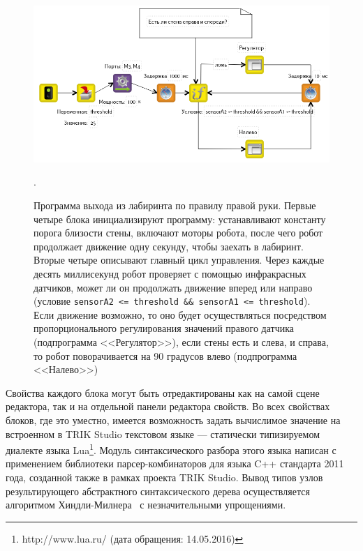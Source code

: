 \documentclass[a5paper]{article}
\begin{document}
\begin{figure}[ht]
    \centering
    \includegraphics[width=4.5in]{TS_CF_Labyrinth_Diagram.png}
    \caption{Программа выхода из лабиринта по правилу правой руки. Первые четыре блока инициализируют программу: устанавливают константу порога близости стены, включают моторы робота, после чего робот продолжает движение одну секунду, чтобы заехать в лабиринт. Вторые четыре описывают главный цикл управления. Через каждые десять миллисекунд робот проверяет с помощью инфракрасных датчиков, может ли он продолжать движение вперед или направо (условие \texttt{sensorA2 <= threshold \&\& sensorA1 <= threshold}). Если движение возможно, то оно будет осуществляться посредством пропорционального регулирования значений правого датчика (подпрограмма <<Регулятор>>), если стены есть и слева, и справа, то робот поворачивается на 90 градусов влево (подпрограмма <<Налево>>)}.
    \label{image:TS_CF_Example}
\end{figure}

Свойства каждого блока могут быть отредактированы как на самой сцене редактора, так и на отдельной панели редактора свойств. Во всех свойствах блоков, где это уместно, имеется возможность задать вычислимое значение на встроенном в TRIK Studio текстовом языке --- статически типизируемом диалекте языка Lua\footnote{http://www.lua.ru/ (дата обращения: 14.05.2016)}. Модуль синтаксического разбора этого языка написан с применением библиотеки парсер-комбинаторов для языка C++ стандарта 2011 года, созданной также в рамках проекта TRIK Studio. Вывод типов узлов результирующего абстрактного синтаксического дерева осуществляется алгоритмом Хиндли-Милнера~\cite{damas1982principal} с незначительными упрощениями.
\end{document}
